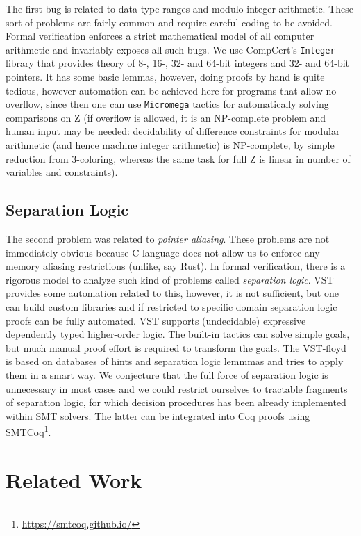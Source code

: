 \documentclass[acmsmall,nonacm]{acmart}
\begin{document}
The first bug is related to data type ranges and modulo integer
arithmetic. These sort of problems are fairly common and require
careful coding to be avoided. Formal verification enforces a strict
mathematical model of all computer arithmetic and invariably exposes
all such bugs. We use CompCert's \texttt{Integer} library that
provides theory of 8-, 16-, 32- and 64-bit integers and 32- and 64-bit
pointers. It has some basic lemmas, however, doing proofs by hand is
quite tedious, however automation can be achieved here for programs
that allow no overflow, since then one can use
\texttt{Micromega}
tactics for automatically solving comparisons on Z (if overflow is
allowed, it is an NP-complete problem and human input may be needed:
decidability of difference constraints for modular arithmetic (and
hence machine integer arithmetic) is NP-complete, by simple reduction
from 3-coloring\cite{PointerConstraintsNP}, whereas the same task for
full Z is linear in number of variables and constraints).


\subsection{Separation Logic}

The second problem was related to \textit{pointer aliasing}. These problems are not immediately obvious because C language does not allow us to enforce any memory aliasing restrictions (unlike, say Rust). In formal verification, there is a rigorous model to analyze such kind of problems called \textit{separation logic}. VST provides some automation related to this, however, it is not sufficient, but one can build custom libraries and if restricted to specific domain separation logic proofs can be fully automated. VST supports (undecidable) expressive dependently typed higher-order logic. The built-in tactics can solve simple goals, but much manual proof effort is required to transform the goals. The VST-floyd is based on databases of hints and separation logic lemmmas and tries to apply them in a smart way. We conjecture that the full force of separation logic is unnecessary in most cases and we could restrict ourselves to tractable fragments of separation logic, for which decision procedures has been already implemented within SMT solvers. The latter can be integrated into Coq proofs using SMTCoq\footnote{\url{https://smtcoq.github.io/}}.


\section{Related Work}
\end{document}
